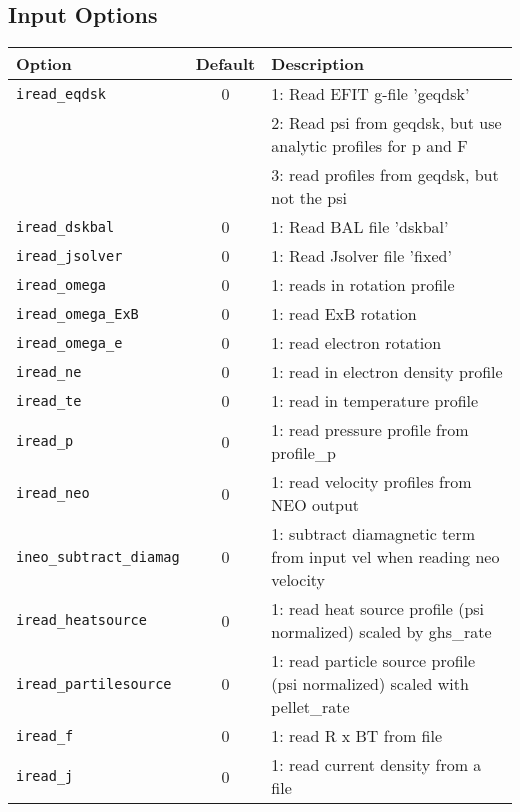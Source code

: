 \subsection{Input Options}

\begin{tabular}{lcp{4in}}
  \textbf{Option}&\textbf{Default}&\textbf{Description}\\
  \hline
  \texttt{iread\_eqdsk}   & 0 & 1: Read EFIT g-file 'geqdsk'\\
                          &   & 2: Read psi from geqdsk, but use analytic profiles for p and F \\
                          &   & 3: read profiles from geqdsk, but not the psi \\
  \texttt{iread\_dskbal}  & 0 & 1: Read BAL file 'dskbal'\\
  \texttt{iread\_jsolver} & 0 & 1: Read Jsolver file 'fixed' \\

 \texttt{iread\_omega}       & 0 & 1: reads in rotation profile \\
 \texttt{iread\_omega\_ExB}  & 0 & 1: read ExB rotation \\
 \texttt{iread\_omega\_e}    & 0 & 1: read electron rotation \\
 \texttt{iread\_ne}          & 0 & 1: read in electron  density profile \\
 \texttt{iread\_te}          & 0 & 1: read in temperature profile \\
 \texttt{iread\_p}           & 0 & 1: read pressure profile from profile\_p \\
 \texttt{iread\_neo}         & 0 & 1: read velocity profiles from NEO output \\
 \texttt{ineo\_subtract\_diamag} & 0 & 1: subtract diamagnetic term from input vel when reading neo velocity \\
 \texttt{iread\_heatsource}      & 0 & 1: read heat source profile (psi normalized) scaled by ghs\_rate \\
 \texttt{iread\_partilesource}   & 0 & 1: read particle source profile (psi normalized) scaled with pellet\_rate \\
 \texttt{iread\_f}               & 0 & 1: read R x BT from file \\
 \texttt{iread\_j}               & 0 & 1: read current density from a file





\end{tabular}

